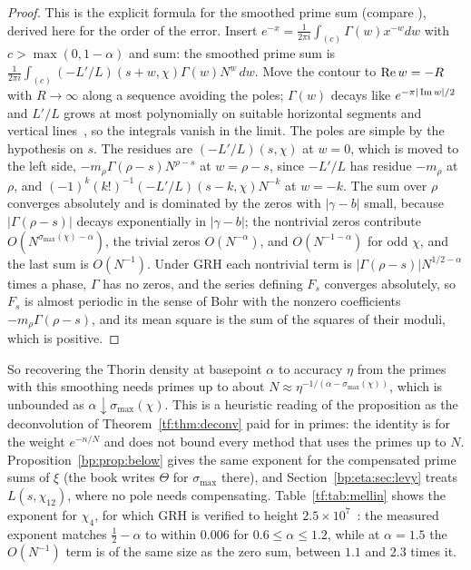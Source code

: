 \begin{proof}
This is the explicit formula for the smoothed prime sum (compare \cite[Chapter~19]{Davenport}), derived here for the order of the error. Insert $e^{-x}=\frac1{2\pi i}\int_{(c)}\Gamma(w)x^{-w}dw$ with $c>\max(0,1-\alpha)$ and sum: the smoothed prime sum is $\frac1{2\pi i}\int_{(c)}(-L'/L)(s+w,\chi)\Gamma(w)N^w\,dw$. Move the contour to $\operatorname{Re} w=-R$ with $R\to\infty$ along a sequence avoiding the poles; $\Gamma(w)$ decays like $e^{-\pi|\operatorname{Im} w|/2}$ and $L'/L$ grows at most polynomially on suitable horizontal segments and vertical lines~\cite[Chapters 16 and 19]{Davenport}, so the integrals vanish in the limit. The poles are simple by the hypothesis on $s$. The residues are $(-L'/L)(s,\chi)$ at $w=0$, which is moved to the left side, $-m_\rho\Gamma(\rho-s)N^{\rho-s}$ at $w=\rho-s$, since $-L'/L$ has residue $-m_\rho$ at $\rho$, and $(-1)^k(k!)^{-1}(-L'/L)(s-k,\chi)N^{-k}$ at $w=-k$. The sum over $\rho$ converges absolutely and is dominated by the zeros with $|\gamma-b|$ small, because $|\Gamma(\rho-s)|$ decays exponentially in $|\gamma-b|$; the nontrivial zeros contribute $O(N^{\sigma_{\max}(\chi)-\alpha})$, the trivial zeros $O(N^{-\alpha})$, and $O(N^{-1-\alpha})$ for odd $\chi$, and the last sum is $O(N^{-1})$. Under GRH each nontrivial term is $|\Gamma(\rho-s)|N^{1/2-\alpha}$ times a phase, $\Gamma$ has no zeros, and the series defining $F_s$ converges absolutely, so $F_s$ is almost periodic in the sense of Bohr with the nonzero coefficients $-m_\rho\Gamma(\rho-s)$, and its mean square is the sum of the squares of their moduli, which is positive.
\end{proof}

So recovering the Thorin density at basepoint $\alpha$ to accuracy $\eta$ from the primes with this smoothing needs primes up to about $N\approx\eta^{-1/(\alpha-\sigma_{\max}(\chi))}$, which is unbounded as $\alpha\downarrow\sigma_{\max}(\chi)$. This is a heuristic reading of the proposition as the deconvolution of Theorem~\ref{tf:thm:deconv} paid for in primes: the identity is for the weight $e^{-n/N}$ and does not bound every method that uses the primes up to $N$. Proposition~\ref{bp:prop:below} gives the same exponent for the compensated prime sums of $\xi$ (the book writes $\Theta$ for $\sigma_{\max}$ there), and Section~\ref{bp:eta:sec:levy} treats $L(s,\chi_{12})$, where no pole needs compensating. Table~\ref{tf:tab:mellin} shows the exponent for $\chi_4$, for which GRH is verified to height $2.5\times10^7$~\cite{Platt16}: the measured exponent matches $\tfrac12-\alpha$ to within $0.006$ for $0.6\le\alpha\le1.2$, while at $\alpha=1.5$ the $O(N^{-1})$ term is of the same size as the zero sum, between $1.1$ and $2.3$ times it.

